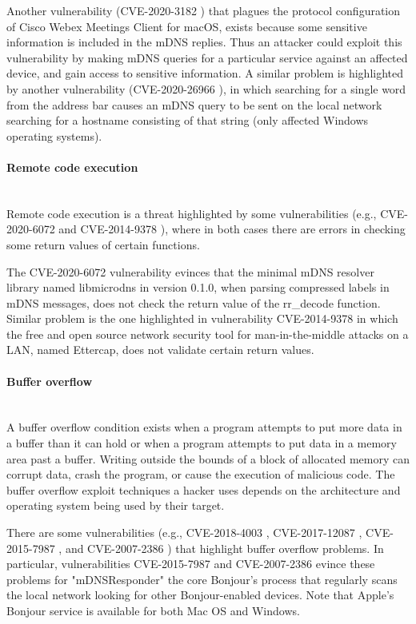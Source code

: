 \documentclass[fleqn, 11pt]{SelfArx} %
\begin{document}
Another vulnerability (CVE-2020-3182 \cite{CVE-2020-3182}) that plagues the protocol configuration of Cisco Webex Meetings Client for macOS, exists because some sensitive information is included in the mDNS replies. Thus an attacker could exploit this vulnerability by making mDNS queries for a particular service against an affected device, and gain access to sensitive information. A similar problem is highlighted by another vulnerability (CVE-2020-26966 \cite{CVE-2020-26966}), in which searching for a single word from the address bar causes an mDNS query to be sent on the local network searching for a hostname consisting of that string (only affected Windows operating systems).
\paragraph{Remote code execution}\mbox{}\\
Remote code execution is a threat highlighted by some vulnerabilities (e.g., CVE-2020-6072 \cite{CVE-2020-6072} and CVE-2014-9378 \cite{CVE-2014-9378}), where in both cases there are errors in checking some return values of certain functions. 

The CVE-2020-6072 {\cite{CVE-2020-6072}} vulnerability evinces that the minimal mDNS resolver library named libmicrodns in version 0.1.0, when parsing compressed labels in mDNS messages, does not check the return value of the rr\_decode function. 
Similar problem is the one highlighted in vulnerability CVE-2014-9378 \cite{CVE-2014-9378} in which the free and open source network security tool for man-in-the-middle attacks on a LAN, named Ettercap, does not validate certain return values.

\paragraph{Buffer overflow}\mbox{}\\
A buffer overflow condition exists when a program attempts to put more data in a buffer than it can hold or when a program attempts to put data in a memory area past a buffer. Writing outside the bounds of a block of allocated memory can corrupt data, crash the program, or cause the execution of malicious code. The buffer overflow exploit techniques a hacker uses depends on the architecture and operating system being used by their target. 

There are some vulnerabilities (e.g., CVE-2018-4003 \cite{CVE-2018-4003}, CVE-2017-12087 \cite{CVE-2017-12087}, CVE-2015-7987 \cite{CVE-2015-7987}, and CVE-2007-2386 \cite{CVE-2007-2386}) that highlight buffer overflow problems. In particular, vulnerabilities CVE-2015-7987 \cite{CVE-2015-7987} and CVE-2007-2386 \cite{CVE-2007-2386} evince these problems for "mDNSResponder" the core Bonjour's process that regularly scans the local network looking for other Bonjour-enabled devices. Note that Apple's Bonjour service is available for both Mac OS and Windows.  
\end{document}
